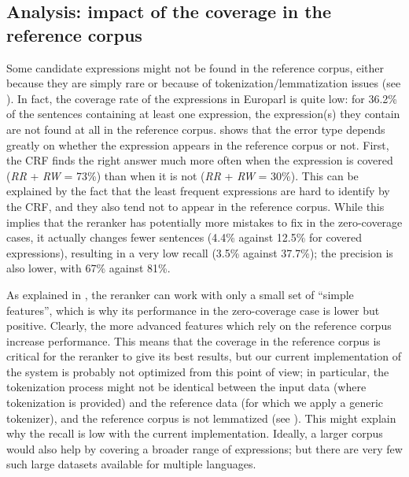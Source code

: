 \documentclass[output=paper
,modfonts
,nonflat]{langsci/langscibook}
\begin{document}
\subsection{Analysis: impact of the coverage in the reference corpus}

Some candidate expressions might not be found in the reference corpus,
either because they are simply rare or because of
tokenization/lemmatization issues (see ). In
fact, the coverage rate of the expressions in Europarl is quite low:
for 36.2\% of the sentences containing at least one expression, the
expression(s) they contain are not found at all in the reference
corpus.  shows that the error type depends
greatly on whether the expression appears in the reference corpus or
not. First, the CRF finds the right answer much more often when the
expression is covered ({\em RR} + {\em RW} = 73\%) than when it is not
({\em RR} + {\em RW} = 30\%). This can be explained by the fact that
the least frequent expressions are hard to identify by the CRF, and
they also tend not to appear in the reference corpus. While this
implies that the reranker has potentially more mistakes to fix in the
zero-coverage cases, it actually changes fewer sentences (4.4\% against
12.5\% for covered expressions), resulting in a very low recall (3.5\%
against 37.7\%); the precision is also lower, with 67\% against 81\%.

As explained in , the reranker can work
with only a small set of ``simple features'', which is why its
performance in the zero-coverage case is lower but positive. Clearly,
the more advanced features which rely on the reference corpus increase
performance. This means that the coverage in the reference corpus is
critical for the reranker to give its best results, but our current
implementation of the system is probably not optimized from this point
of view; in particular, the tokenization process might not be
identical between the input data (where tokenization is provided) and
the reference data (for which we apply a generic tokenizer), and the
reference corpus is not lemmatized (see ). This
might explain why the recall is low with the current
implementation. Ideally, a larger corpus would also help by covering a
broader range of expressions; but there are very few such large
datasets available for multiple languages.
\end{document}
